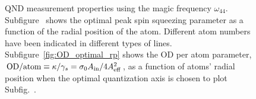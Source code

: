 \documentclass[preprint,aps,pra,onecolumn]{revtex4-1} %
\begin{document}
\begin{figure}
\begin{minipage}{.49\linewidth}
\centering
{}
\end{minipage}
\begin{minipage}{.49\linewidth}
\centering
{}
\end{minipage}
\caption{QND measurement properties using the magic frequency $ \omega_{44} $. Subfigure~\protect{} shows the optimal peak spin squeezing parameter as a function of the radial position of the atom. Different atom numbers have been indicated in different types of lines. Subfigure~\ref{fig:OD_optimal_rp} shows the OD per atom parameter, $ \mathrm{OD}/{\mathrm{atom}}\equiv \kappa/\gamma_s= \sigma_0A_{\rm in}/4A_{\rm eff}^2 $, as a function of atoms' radial position when the optimal quantization axis is chosen to plot Subfig.~\protect{}. }\label{fig:QNDproperty_magic44}
\end{figure}
\end{document}
